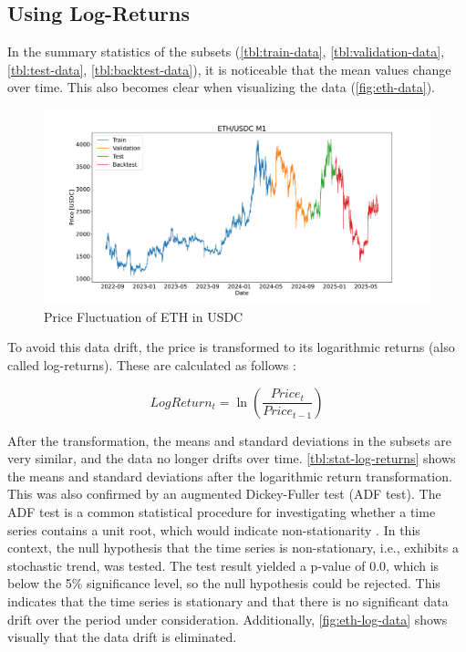 \subsection{Using Log-Returns}
\label{chap:log-returns}

In the summary statistics of the subsets (\autoref{tbl:train-data}, \autoref{tbl:validation-data}, \autoref{tbl:test-data}, \autoref{tbl:backtest-data}), it is noticeable that the mean values change over time.
This also becomes clear when visualizing the data (\autoref{fig:eth-data}).

\begin{figure}[H]
    \centering
    \includegraphics[width=\textwidth]{images/eda/ethusdc_price}
    \caption{Price Fluctuation of ETH in USDC}
    \label{fig:eth-data}
\end{figure}

\noindent
To avoid this data drift, the price is transformed to its logarithmic returns (also called log-returns).
These are calculated as follows \cite{log-returns}:

\[
    LogReturn_t = \ln\left(\frac{Price_t}{Price_{t-1}}\right)
\]

\noindent
After the transformation, the means and standard deviations in the subsets are very similar, and the data no longer drifts over time.
\autoref{tbl:stat-log-returns} shows the means and standard deviations after the logarithmic return transformation.
This was also confirmed by an augmented Dickey-Fuller test (ADF test).
The ADF test is a common statistical procedure for investigating whether a time series contains a unit root, which would indicate non-stationarity \cite{adf}.
In this context, the null hypothesis that the time series is non-stationary, i.e., exhibits a stochastic trend, was tested.
The test result yielded a p-value of 0.0, which is below the 5\% significance level, so the null hypothesis could be rejected.
This indicates that the time series is stationary and that there is no significant data drift over the period under consideration.
Additionally, \autoref{fig:eth-log-data} shows visually that the data drift is eliminated.

